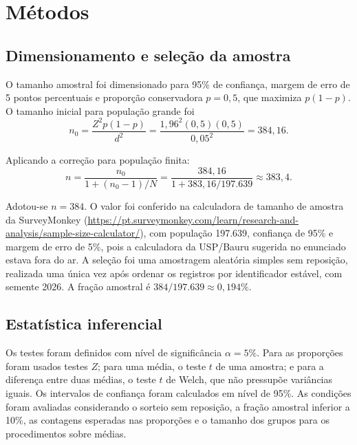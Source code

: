 \documentclass[12pt,a4paper]{article}
\begin{document}
\section{Métodos}

\subsection{Dimensionamento e seleção da amostra}

O tamanho amostral foi dimensionado para 95\% de confiança, margem de erro de 5 pontos percentuais e proporção conservadora \(p=0{,}5\), que maximiza \(p(1-p)\). O tamanho inicial para população grande foi
\[
n_0=\frac{Z^2p(1-p)}{d^2}
=\frac{1{,}96^2(0{,}5)(0{,}5)}{0{,}05^2}
=384{,}16.
\]

Aplicando a correção para população finita:
\[
n=\frac{n_0}{1+(n_0-1)/N}
=\frac{384{,}16}{1+383{,}16/197.639}
\approx 383{,}4.
\]

Adotou-se \(n=384\). O valor foi conferido na calculadora de tamanho de amostra da SurveyMonkey (\url{https://pt.surveymonkey.com/learn/research-and-analysis/sample-size-calculator/}), com população 197.639, confiança de 95\% e margem de erro de 5\%, pois a calculadora da USP/Bauru sugerida no enunciado estava fora do ar. A seleção foi uma amostragem aleatória simples sem reposição, realizada uma única vez após ordenar os registros por identificador estável, com semente 2026. A fração amostral é \(384/197.639\approx0{,}194\%\).

\subsection{Estatística inferencial}

Os testes foram definidos com nível de significância \(\alpha=5\%\). Para as proporções foram usados testes \(Z\); para uma média, o teste \(t\) de uma amostra; e para a diferença entre duas médias, o teste \(t\) de Welch, que não pressupõe variâncias iguais. Os intervalos de confiança foram calculados em nível de 95\%. As condições foram avaliadas considerando o sorteio sem reposição, a fração amostral inferior a 10\%, as contagens esperadas nas proporções e o tamanho dos grupos para os procedimentos sobre médias.
\end{document}
